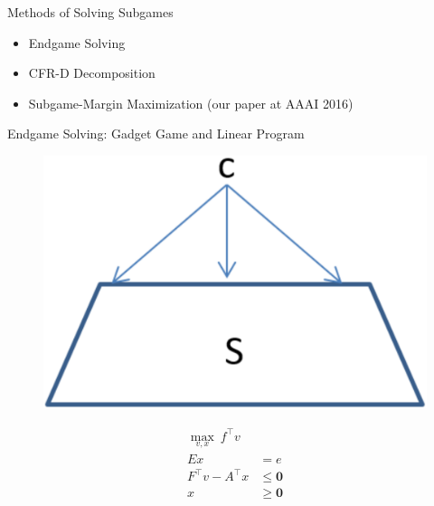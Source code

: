 \documentclass{beamer}
\theoremstyle{definition}
\newcommand{\vect}[1]{\boldsymbol{#1}}
\begin{document}
  \begin{frame}{Methods of Solving Subgames}
    \pause
    \begin{itemize}[<+- | alert@+>]
      \item Endgame Solving
      \item CFR-D Decomposition
      \item Subgame-Margin Maximization (our paper at AAAI 2016)
    \end{itemize}
  \end{frame}

  {
    \begin{frame}{Endgame Solving: Gadget Game and Linear Program}
      \begin{figure}
        \centering
        \includegraphics[width=.5\textwidth]{../img/endgame-solving-gadget.png}
      \end{figure}
      \pause

      \begin{equation*}
        \label{lp:endgame-solving}
        \begin{split}
          \max_{v, x}\  f^\top v & \\
          Ex &= e \\
          F^\top v - A^\top x &\le \vect{0} \\
          x &\ge \vect{0}
        \end{split}
      \end{equation*}
    \end{frame}
  }
\end{document}
